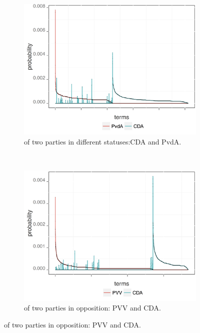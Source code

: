 \begin{figure}[!t]
        \centering
        \begin{subfigure}[b]{0.32\textwidth}
\includegraphics[width=\linewidth]{02-part-01/chapter-03/figs_and_tables/img_PvdA-CDA.png}
\caption{\label{fig:HSPCO} \achswlm of two parties in different statuses:CDA and PvdA.}
        \end{subfigure}
        ~ 
        \begin{subfigure}[b]{0.32\textwidth}
\centering
\includegraphics[width=\linewidth]{02-part-01/chapter-03/figs_and_tables/img_PVV-CDA.png}
\caption{\label{fig:HSPOO} \achswlm of two parties in opposition: PVV and CDA.}
        \end{subfigure}

\end{figure}
